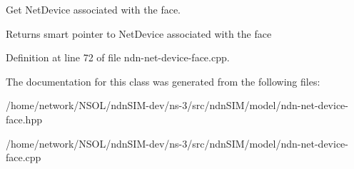 Get Net\+Device associated with the face. 

\begin{DoxyReturn}{Returns}
smart pointer to Net\+Device associated with the face 
\end{DoxyReturn}


Definition at line 72 of file ndn-\/net-\/device-\/face.\+cpp.



The documentation for this class was generated from the following files\+:\begin{DoxyCompactItemize}
\item 
/home/network/\+N\+S\+O\+L/ndn\+S\+I\+M-\/dev/ns-\/3/src/ndn\+S\+I\+M/model/ndn-\/net-\/device-\/face.\+hpp\item 
/home/network/\+N\+S\+O\+L/ndn\+S\+I\+M-\/dev/ns-\/3/src/ndn\+S\+I\+M/model/ndn-\/net-\/device-\/face.\+cpp\end{DoxyCompactItemize}
